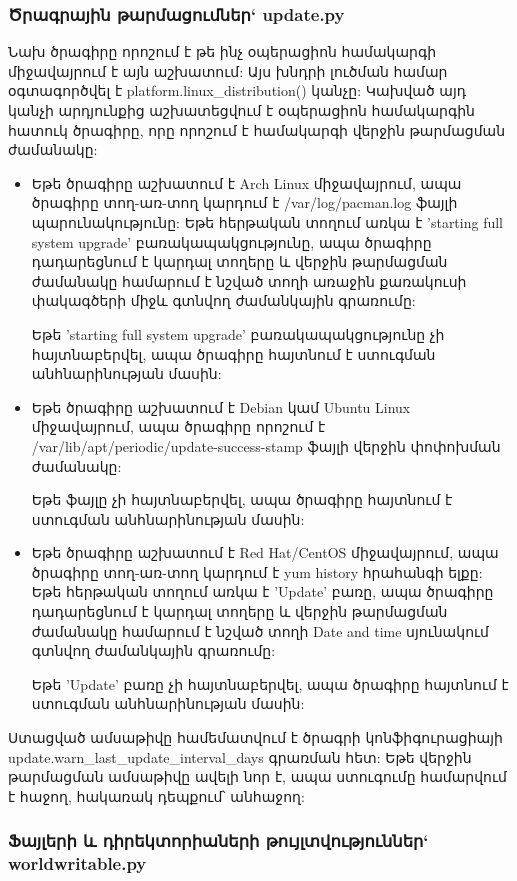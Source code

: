 \documentclass[a4paper,12pt]{article}
\begin{document}
\begin{sloppypar}
\subsubsection{Ծրագրային թարմացումներ` update.py}


Նախ ծրագիրը որոշում է թե ինչ օպերացիոն համակարգի միջավայրում է այն աշխատում:
Այս խնդրի լուծման համար օգտագործվել է platform.linux\_distribution() կանչը:
Կախված այդ կանչի արդյունքից աշխատեցվում է օպերացիոն համակարգին հատուկ
ծրագիրը, որը որոշում է համակարգի վերջին թարմացման ժամանակը:

\begin{itemize}
\item Եթե ծրագիրը աշխատում է Arch Linux միջավայրում, ապա ծրագիրը տող-առ-տող
    կարդում է /var/log/pacman.log ֆայլի պարունակությունը: Եթե հերթական տողում առկա է
	'starting full system upgrade' բառակապակցությունը, ապա ծրագիրը դադարեցնում
	է կարդալ տողերը և վերջին թարմացման ժամանակը համարում է նշված տողի առաջին
	քառակուսի փակագծերի միջև գտնվող ժամանկային գրառումը:

	Եթե 'starting full system upgrade' բառակապակցությունը չի հայտնաբերվել,
	ապա ծրագիրը հայտնում է ստուգման անհնարինության մասին:
\item Եթե ծրագիրը աշխատում է Debian կամ Ubuntu Linux միջավայրում, ապա ծրագիրը
	որոշում է /var/lib/apt/periodic/update-success-stamp ֆայլի վերջին փոփոխման
	ժամանակը:

	Եթե ֆայլը չի հայտնաբերվել, ապա ծրագիրը հայտնում է ստուգման անհնարինության
	մասին:
\item Եթե ծրագիրը աշխատում է Red Hat/CentOS միջավայրում, ապա ծրագիրը տող-առ-տող
    կարդում է yum history հրահանգի ելքը: Եթե հերթական տողում առկա է
	'Update' բառը, ապա ծրագիրը դադարեցնում
	է կարդալ տողերը և վերջին թարմացման ժամանակը համարում է նշված տողի 
	Date and time սյունակում գտնվող ժամանկային գրառումը:

	Եթե 'Update' բառը չի հայտնաբերվել, ապա ծրագիրը հայտնում է ստուգման անհնարինության մասին:
\end{itemize}

Ստացված ամսաթիվը համեմատվում է ծրագրի կոնֆիգուրացիայի
update.warn\_last\_update\_interval\_days
գրառման հետ: Եթե վերջին թարմացման ամսաթիվը ավելի նոր է,
ապա ստուգումը համարվում է հաջող, հակառակ դեպքում՝ անհաջող:


\subsubsection{Ֆայլերի և դիրեկտորիաների թույլտվություններ` worldwritable.py}



\end{sloppypar}
\end{document}
